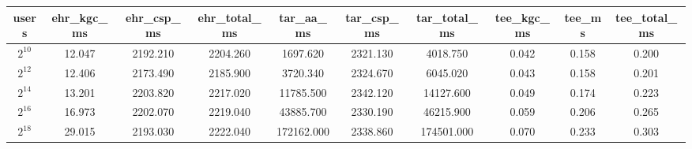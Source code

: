 \begin{tabular}{c c c c c c c c c c}
\toprule
users & ehr\_kgc\_ms & ehr\_csp\_ms & ehr\_total\_ms & tar\_aa\_ms & tar\_csp\_ms & tar\_total\_ms & tee\_kgc\_ms & tee\_ms & tee\_total\_ms \\
\midrule
$2^10$ & 12.047 & 2192.210 & 2204.260 & 1697.620 & 2321.130 & 4018.750 & 0.042 & 0.158 & 0.200 \\
$2^12$ & 12.406 & 2173.490 & 2185.900 & 3720.340 & 2324.670 & 6045.020 & 0.043 & 0.158 & 0.201 \\
$2^14$ & 13.201 & 2203.820 & 2217.020 & 11785.500 & 2342.120 & 14127.600 & 0.049 & 0.174 & 0.223 \\
$2^16$ & 16.973 & 2202.070 & 2219.040 & 43885.700 & 2330.190 & 46215.900 & 0.059 & 0.206 & 0.265 \\
$2^18$ & 29.015 & 2193.030 & 2222.040 & 172162.000 & 2338.860 & 174501.000 & 0.070 & 0.233 & 0.303 \\
\bottomrule
\end{tabular}
